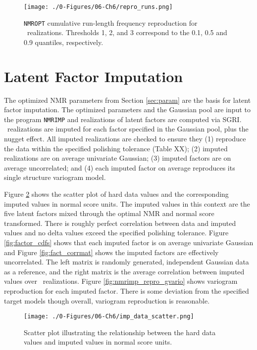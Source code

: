 \begin{figure}[htb!]
    \centering
    \texttt{[image: ./0-Figures/06-Ch6/repro\_runs.png]}
    \caption{\texttt{NMROPT} cumulative run-length frequency reproduction for \csnreals \ realizations. Thresholds 1, 2, and 3 correspond to the 0.1, 0.5 and 0.9 quantiles, respectively.}
    \label{fig:nmropt_repro_runs}
\end{figure}


\FloatBarrier
\section{Latent Factor Imputation}
\label{sec:fact_imp}

The optimized \gls{NMR} parameters from Section \ref{sec:param} are the basis for latent factor imputation. The optimized parameters and the Gaussian pool are input to the program \texttt{NMRIMP} and realizations of latent factors are computed via \gls{SGRI}. \csnreals \ realizations are imputed for each factor specified in the Gaussian pool, plus the nugget effect. All imputed realizations are checked to ensure they (1) reproduce the data within the specified polishing tolerance (Table XX); (2) imputed realizations are on average univariate Gaussian; (3) imputed factors are on average uncorrelated; and (4) each imputed factor on average reproduces its single structure variogram model.

Figure \ref{fig:imp_data_scatter} shows the scatter plot of hard data values and the corresponding imputed values in normal score units. The imputed values in this context are the five latent factors mixed through the optimal \gls{NMR} and normal score transformed. There is roughly perfect correlation between data and imputed values and no delta values exceed the specified polishing tolerance. Figure \ref{fig:factor_cdfs} shows that each imputed factor is on average univariate Gaussian and Figure \ref{fig:fact_corrmat} shows the imputed factors are effectively uncorrelated. The left matrix is randomly generated, independent Gaussian data as a reference, and the right matrix is the average correlation between imputed values over \csnreals \ realizations. Figure \ref{fig:nmrimp_repro_gvario} shows variogram reproduction for each imputed factor. There is some deviation from the specified target models though overall, variogram reproduction is reasonable.

\begin{figure}[htb!]
    \centering
    \texttt{[image: ./0-Figures/06-Ch6/imp\_data\_scatter.png]}
    \caption{Scatter plot illustrating the relationship between the hard data values and imputed values in normal score units. }
    \label{fig:imp_data_scatter}
\end{figure}

